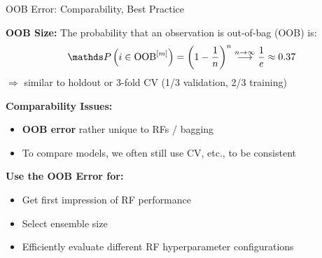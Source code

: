 \documentclass[11pt,compress,t,notes=noshow,xcolor=table]{beamer}
\begin{document}
\begin{vbframe}{OOB Error: Comparability, Best Practice}

\textbf{OOB Size:} The probability that an observation is out-of-bag (OOB) is:
$$\P \left(i \in \oobm\right) = \left(1 - \frac{1}{n}\right)^n \stackrel{n \to \infty}{\longrightarrow} \frac{1}{e} \approx 0.37$$
$\Rightarrow$ similar to holdout or 3-fold CV (1/3 validation, 2/3 training)

\textbf{Comparability Issues:}
\begin{itemize}
\item \textbf{OOB error} rather unique to RFs / bagging
\item To compare models, we often still use CV, etc., to be consistent
\end{itemize}

\textbf{Use the OOB Error for:}
\begin{itemize}
  \item Get first impression of RF performance
  \item Select ensemble size
\item Efficiently evaluate different RF hyperparameter configurations
\end{itemize}


\end{vbframe}

\endlecture
\end{document}

